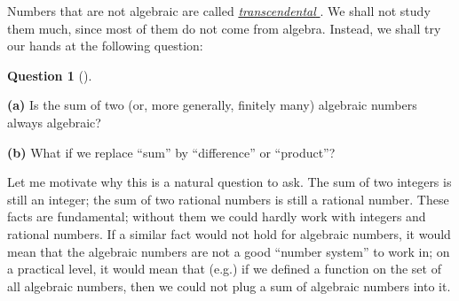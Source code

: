 \documentclass[numbers=enddot,12pt,final,onecolumn,notitlepage]{scrartcl}%
\numberwithin{exer}{section}
\theoremstyle{definition}
\newtheorem{quest}[theo]{Question}
\newenvironment{question}[1][]
{\begin{quest}[#1]\begin{leftbar}}
{\end{leftbar}\end{quest}}
\newenvironment{question}[1][Question]{\noindent\textbf{#1.} }{\ \rule{0.5em}{0.5em}}
\begin{document}
Numbers that are not algebraic are called
\href{https://en.wikipedia.org/wiki/Transcendental_number}{\textit{transcendental}%
}. We shall not study them much, since most of them do not come from algebra.
Instead, we shall try our hands at the following question:

\begin{question}
\label{quest.intro.algnum.1} \textbf{(a)} Is the sum of two (or, more
generally, finitely many) algebraic numbers always algebraic?

\textbf{(b)} What if we replace ``sum'' by ``difference'' or ``product''?
\end{question}

Let me motivate why this is a natural question to ask. The sum of two integers
is still an integer; the sum of two rational numbers is still a rational
number. These facts are fundamental; without them we could hardly work with
integers and rational numbers. If a similar fact would not hold for algebraic
numbers, it would mean that the algebraic numbers are not a good ``number
system'' to work in; on a practical level, it would mean that (e.g.) if we
defined a function on the set of all algebraic numbers, then we could not plug
a sum of algebraic numbers into it.
\end{document}
